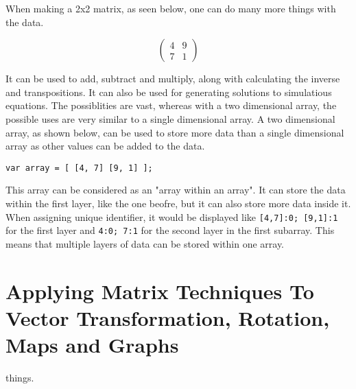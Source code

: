 \documentclass[a4paper,10pt]{article}
\begin{document}
      When making a 2x2 matrix, as seen below, one can do many more things with the data.

      \begin{equation*}
        \begin{pmatrix}
          4 & 9\\
          7 & 1
        \end{pmatrix}
      \end{equation*}

      It can be used to add, subtract and multiply, along with calculating the inverse and transpositions. It can also be used for generating solutions to simulatious equations. The possiblities are vast, whereas with a two dimensional array, the possible uses are very similar to a single dimensional array. A two dimensional array, as shown below, can be used to store more data than a single dimensional array as other values can be added to the data.

      \texttt{var array = [ [4, 7] [9, 1] ];}

      This array can be considered as an "array within an array". It can store the data within the first layer, like the one beofre, but it can also store more data inside it. When assigning unique identifier, it would be displayed like \texttt{[4,7]:0; [9,1]:1} for the first layer and \texttt{4:0; 7:1} for the second layer in the first subarray. This means that multiple layers of data can be stored within one array.

    \newpage

    \section{Applying Matrix Techniques To Vector Transformation, Rotation, Maps and Graphs}
      things.
\end{document}
